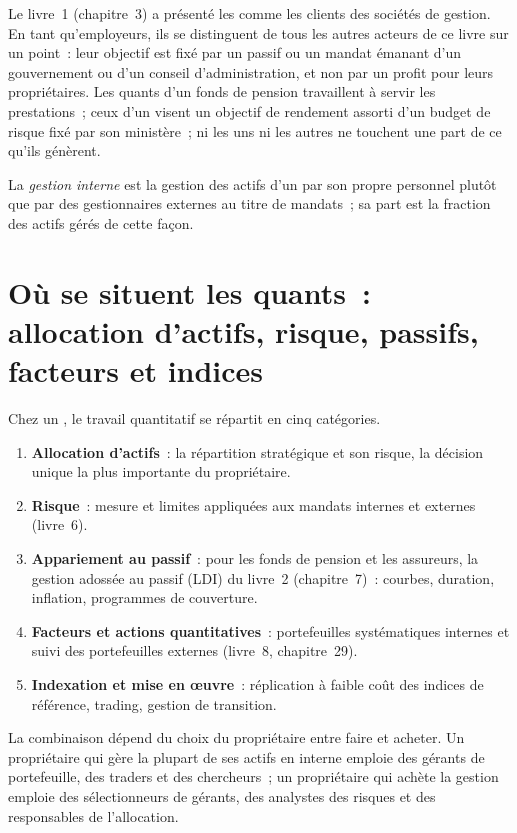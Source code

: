 Le livre~1 (chapitre~3) a présenté les  comme les clients des sociétés de gestion. En tant qu'employeurs, ils se distinguent de tous les autres
acteurs de ce livre sur un point~: leur objectif est fixé par un passif ou un mandat émanant d'un gouvernement ou d'un conseil d'administration, et non par un profit pour
leurs propriétaires. Les quants d'un fonds de pension travaillent à servir les prestations~; ceux d'un  visent un objectif de rendement assorti d'un budget de risque fixé
par son ministère~; ni les uns ni les autres ne touchent une part de ce qu'ils génèrent.

\begin{definition}\label{def:in:asset-managers-pensions-sovereign-funds-and-insurers:internal}
La \emph{gestion interne} est la gestion des actifs d'un  par son propre personnel
plutôt que par des gestionnaires externes au titre de mandats~; sa part est la fraction des actifs gérés de cette façon.
\end{definition}

\section{Où se situent les quants~: allocation d'actifs, risque, passifs, facteurs et indices}

Chez un , le travail quantitatif se répartit en cinq catégories.
\begin{enumerate}
\item \textbf{Allocation d'actifs}~: la répartition stratégique et son risque, la décision unique la plus importante du propriétaire.
\item \textbf{Risque}~: mesure et limites appliquées aux mandats internes et externes (livre~6).
\item \textbf{Appariement au passif}~: pour les fonds de pension et les assureurs, la gestion adossée au passif (LDI) du livre~2 (chapitre~7)~:
courbes, duration, inflation, programmes de couverture.
\item \textbf{Facteurs et actions quantitatives}~: portefeuilles systématiques internes et suivi des portefeuilles externes
(livre~8, chapitre~29).
\item \textbf{Indexation et mise en œuvre}~: réplication à faible coût des indices de référence, trading, gestion de transition.
\end{enumerate}
La combinaison dépend du choix du propriétaire entre faire et acheter. Un propriétaire qui gère la plupart de ses actifs en interne emploie
des gérants de portefeuille, des traders et des chercheurs~; un propriétaire qui achète la gestion emploie des sélectionneurs de gérants, des analystes des risques et
des responsables de l'allocation.

